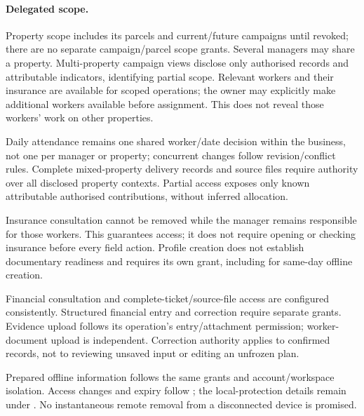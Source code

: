 \paragraph{Delegated scope.}
Property scope includes its parcels and current/future campaigns until revoked;
there are no separate campaign/parcel scope grants. Several managers may share a
property. Multi-property campaign views disclose only authorised records and
attributable indicators, identifying partial scope. Relevant workers and their
insurance are available for scoped operations; the owner may explicitly make
additional workers available before assignment. This does not reveal those
workers' work on other properties.

Daily attendance remains one shared worker/date decision within the business,
not one per manager or property; concurrent changes follow revision/conflict
rules. Complete mixed-property delivery records and source files require authority
over all disclosed property contexts. Partial access exposes only known
attributable authorised contributions, without inferred allocation.

Insurance consultation cannot be removed while the manager remains responsible
for those workers. This guarantees access; it does not require opening or checking
insurance before every field action. Profile creation does not establish documentary
readiness and requires its own grant, including for same-day offline creation.

Financial consultation and complete-ticket/source-file access are configured
consistently. Structured financial entry and correction require separate grants.
Evidence upload follows its operation's entry/attachment permission; worker-document
upload is independent. Correction authority applies to confirmed records, not to
reviewing unsaved input or editing an unfrozen plan.

Prepared offline information follows the same grants and account/workspace isolation.
Access changes and expiry follow \hyperref[br:002]{}; the local-protection
details remain under . No instantaneous remote removal from a
disconnected device is promised.
